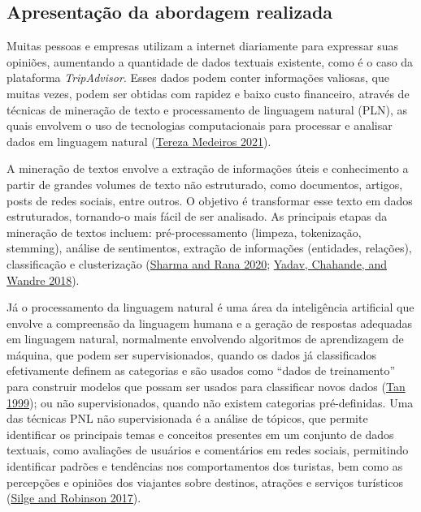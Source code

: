 \documentclass[preprint, 3p,
authoryear]{elsarticle} %
\begin{document}
\hypertarget{apresentauxe7uxe3o-da-abordagem-realizada}{%
\subsection{Apresentação da abordagem
realizada}\label{apresentauxe7uxe3o-da-abordagem-realizada}}

Muitas pessoas e empresas utilizam a internet diariamente para expressar
suas opiniões, aumentando a quantidade de dados textuais existente, como
é o caso da plataforma \emph{TripAdvisor}. Esses dados podem conter
informações valiosas, que muitas vezes, podem ser obtidas com rapidez e
baixo custo financeiro, através de técnicas de mineração de texto e
processamento de linguagem natural (PLN), as quais envolvem o uso de
tecnologias computacionais para processar e analisar dados em linguagem
natural (\protect\hyperlink{ref-medeiros2021}{Tereza Medeiros 2021}).

A mineração de textos envolve a extração de informações úteis e
conhecimento a partir de grandes volumes de texto não estruturado, como
documentos, artigos, posts de redes sociais, entre outros. O objetivo é
transformar esse texto em dados estruturados, tornando-o mais fácil de
ser analisado. As principais etapas da mineração de textos incluem:
pré-processamento (limpeza, tokenização, stemming), análise de
sentimentos, extração de informações (entidades, relações),
classificação e clusterização (\protect\hyperlink{ref-Sharma2020}{Sharma
and Rana 2020}; \protect\hyperlink{ref-Yadav2018}{Yadav, Chahande, and
Wandre 2018}).

Já o processamento da linguagem natural é uma área da inteligência
artificial que envolve a compreensão da linguagem humana e a geração de
respostas adequadas em linguagem natural, normalmente envolvendo
algoritmos de aprendizagem de máquina, que podem ser supervisionados,
quando os dados já classificados efetivamente definem as categorias e
são usados como ``dados de treinamento'' para construir modelos que
possam ser usados para classificar novos dados
(\protect\hyperlink{ref-Tan1999}{Tan 1999}); ou não supervisionados,
quando não existem categorias pré-definidas. Uma das técnicas PNL não
supervisionada é a análise de tópicos, que permite identificar os
principais temas e conceitos presentes em um conjunto de dados textuais,
como avaliações de usuários e comentários em redes sociais, permitindo
identificar padrões e tendências nos comportamentos dos turistas, bem
como as percepções e opiniões dos viajantes sobre destinos, atrações e
serviços turísticos (\protect\hyperlink{ref-Silge2017}{Silge and
Robinson 2017}).
\end{document}
